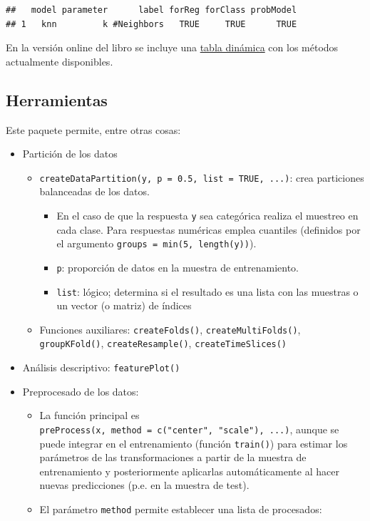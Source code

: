 \documentclass[
  spanish,
]{book}
\theoremstyle{break}
\theoremstyle{definition}
\theoremstyle{definition}
\theoremstyle{definition}
\theoremstyle{remark}
\begin{document}
\begin{verbatim}
##   model parameter      label forReg forClass probModel
## 1   knn         k #Neighbors   TRUE     TRUE      TRUE
\end{verbatim}

En la versión online del libro se incluye una \href{https://rubenfcasal.github.io/aprendizaje_estadistico/caret.html}{tabla dinámica} con los métodos actualmente disponibles.

\hypertarget{herramientas}{%
\subsection{Herramientas}\label{herramientas}}

Este paquete permite, entre otras cosas:

\begin{itemize}
\item
  Partición de los datos

  \begin{itemize}
  \item
    \texttt{createDataPartition(y,\ p\ =\ 0.5,\ list\ =\ TRUE,\ ...)}: crea particiones balanceadas de los datos.

    \begin{itemize}
    \item
      En el caso de que la respuesta \texttt{y} sea categórica realiza el muestreo en cada clase. Para respuestas numéricas emplea cuantiles (definidos por el argumento \texttt{groups\ =\ min(5,\ length(y))}).
    \item
      \texttt{p}: proporción de datos en la muestra de entrenamiento.
    \item
      \texttt{list}: lógico; determina si el resultado es una lista con las muestras o un vector (o matriz) de índices
    \end{itemize}
  \item
    Funciones auxiliares: \texttt{createFolds()}, \texttt{createMultiFolds()}, \texttt{groupKFold()}, \texttt{createResample()}, \texttt{createTimeSlices()}
  \end{itemize}
\item
  Análisis descriptivo: \texttt{featurePlot()}
\item
  Preprocesado de los datos:

  \begin{itemize}
  \item
    La función principal es \texttt{preProcess(x,\ method\ =\ c("center",\ "scale"),\ ...)}, aunque se puede integrar en el entrenamiento (función \texttt{train()}) para estimar los parámetros de las transformaciones a partir de la muestra de entrenamiento y posteriormente aplicarlas automáticamente al hacer nuevas predicciones (p.e. en la muestra de test).
  \item
    El parámetro \texttt{method} permite establecer una lista de procesados:


\end{itemize}
\end{itemize}
\end{document}
